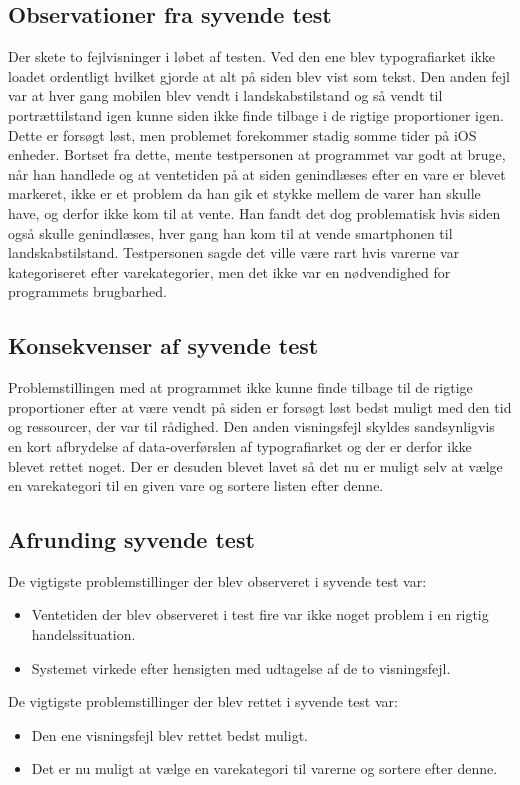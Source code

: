 \subsection{Observationer fra syvende test}
Der skete to fejlvisninger i løbet af testen. Ved den ene blev typografiarket ikke loadet ordentligt hvilket gjorde at alt på siden blev vist som tekst. Den anden fejl var at hver gang mobilen blev vendt i landskabstilstand og så vendt til portrættilstand igen kunne siden ikke finde tilbage i de rigtige proportioner igen. Dette er forsøgt løst, men problemet forekommer stadig somme tider på iOS enheder. Bortset fra dette, mente testpersonen at programmet var godt at bruge, når han handlede og at ventetiden på at siden genindlæses efter en vare er blevet markeret, ikke er et problem da han gik et stykke mellem de varer han skulle have, og derfor ikke kom til at vente. Han fandt det dog problematisk hvis siden også skulle genindlæses, hver gang han kom til at vende smartphonen til landskabstilstand. Testpersonen sagde det ville være rart hvis varerne var kategoriseret efter varekategorier, men det ikke var en nødvendighed for programmets brugbarhed.

\subsection{Konsekvenser af syvende test}
Problemstillingen med at programmet ikke kunne finde tilbage til de rigtige proportioner efter at være vendt på siden er forsøgt løst bedst muligt med den tid og ressourcer, der var til rådighed. Den anden visningsfejl skyldes sandsynligvis en kort afbrydelse af data-overførslen af typografiarket og der er derfor ikke blevet rettet noget. Der er desuden blevet lavet så det nu er muligt selv at vælge en varekategori til en given vare og sortere listen efter denne.

\subsection{Afrunding syvende test}
De vigtigste problemstillinger der blev observeret i syvende test var:
\begin{itemize}
\item Ventetiden der blev observeret i test fire var ikke noget problem i en rigtig handelssituation.
\item Systemet virkede efter hensigten med udtagelse af de to visningsfejl.
\end{itemize}
De vigtigste problemstillinger der blev rettet i syvende test var:
\begin{itemize}
\item Den ene visningsfejl blev rettet bedst muligt.
\item Det er nu muligt at vælge en varekategori til varerne og sortere efter denne.
\end{itemize}